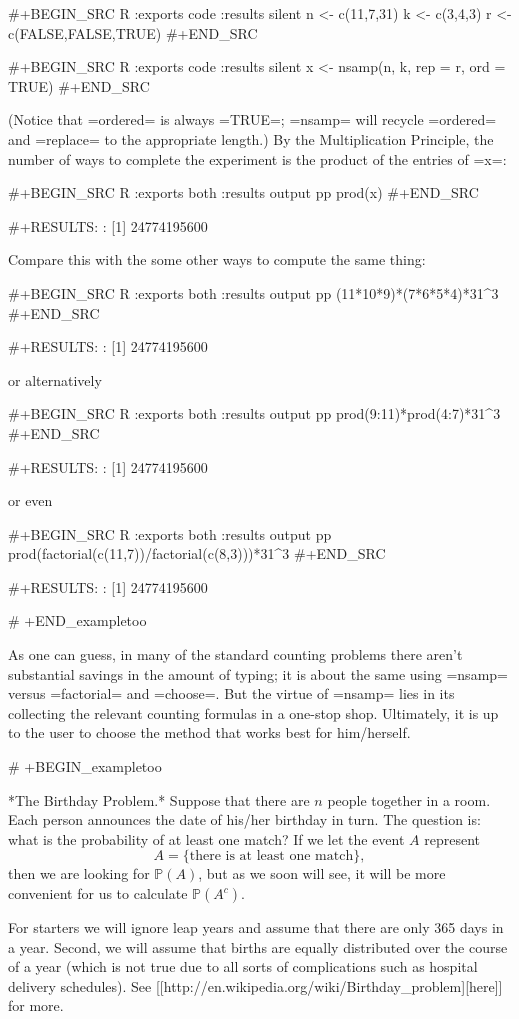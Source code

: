 #+BEGIN_SRC R :exports code :results silent
n <- c(11,7,31) 
k <- c(3,4,3) 
r <- c(FALSE,FALSE,TRUE) 
#+END_SRC 

#+BEGIN_SRC R :exports code :results silent
x <- nsamp(n, k, rep = r, ord = TRUE) 
#+END_SRC 

(Notice that =ordered= is always =TRUE=; =nsamp= will recycle
=ordered= and =replace= to the appropriate length.) By the
Multiplication Principle, the number of ways to complete the
experiment is the product of the entries of =x=:

#+BEGIN_SRC R :exports both :results output pp   
prod(x) 
#+END_SRC 

#+RESULTS:
: [1] 24774195600

Compare this with the some other ways to compute the same thing: 

#+BEGIN_SRC R :exports both :results output pp   
(11*10*9)*(7*6*5*4)*31^3 
#+END_SRC

#+RESULTS:
: [1] 24774195600

or alternatively 

#+BEGIN_SRC R :exports both :results output pp   
prod(9:11)*prod(4:7)*31^3 
#+END_SRC 

#+RESULTS:
: [1] 24774195600

or even 

#+BEGIN_SRC R :exports both :results output pp   
prod(factorial(c(11,7))/factorial(c(8,3)))*31^3 
#+END_SRC 

#+RESULTS:
: [1] 24774195600

# +END_exampletoo


As one can guess, in many of the standard counting problems there
aren't substantial savings in the amount of typing; it is about the
same using =nsamp= versus =factorial= and =choose=. But the virtue of
=nsamp= lies in its collecting the relevant counting formulas in a
one-stop shop. Ultimately, it is up to the user to choose the method
that works best for him/herself.

# +BEGIN_exampletoo

*The Birthday Problem.* Suppose that there are \(n\) people together
in a room. Each person announces the date of his/her birthday in
turn. The question is: what is the probability of at least one match?
If we let the event \(A\) represent \[ A = \{ \mbox{there is at least
one match}\}, \] then we are looking for \(\mathbb{P}(A)\), but as we
soon will see, it will be more convenient for us to calculate
\(\mathbb{P}(A^{c})\).

For starters we will ignore leap years and assume that there are only
365 days in a year. Second, we will assume that births are equally
distributed over the course of a year (which is not true due to all
sorts of complications such as hospital delivery schedules). See [[http://en.wikipedia.org/wiki/Birthday_problem][here]]
for more.

